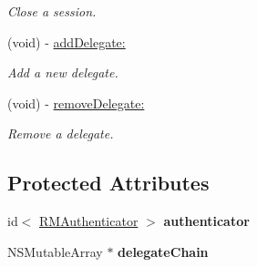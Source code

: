 \begin{DoxyCompactItemize}
\begin{DoxyCompactList}\small\item\em Close a session. \item\end{DoxyCompactList}\item 
(void) -\/ \hyperlink{interface_r_m_session_a20ee0730741132192d4245108509bbb8}{addDelegate:}
\begin{DoxyCompactList}\small\item\em Add a new delegate. \item\end{DoxyCompactList}\item 
(void) -\/ \hyperlink{interface_r_m_session_a692b571f760d3c4e536b8c048721a61b}{removeDelegate:}
\begin{DoxyCompactList}\small\item\em Remove a delegate. \item\end{DoxyCompactList}\end{DoxyCompactItemize}
\subsection*{Protected Attributes}
\begin{DoxyCompactItemize}
\item 
\hypertarget{interface_r_m_session_a759f830479707308f14b1405f6968379}{
id$<$ \hyperlink{protocol_r_m_authenticator-p}{RMAuthenticator} $>$ {\bfseries authenticator}}
\label{interface_r_m_session_a759f830479707308f14b1405f6968379}

\item 
\hypertarget{interface_r_m_session_ac4f774f899a7a0b0e974ccf8de73a786}{
NSMutableArray $\ast$ {\bfseries delegateChain}}
\label{interface_r_m_session_ac4f774f899a7a0b0e974ccf8de73a786}

\end{DoxyCompactItemize}
